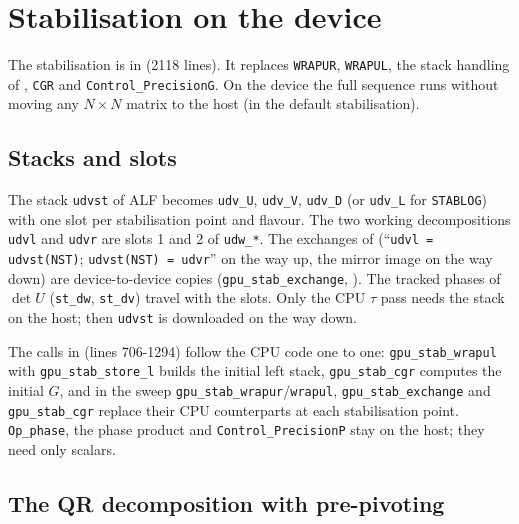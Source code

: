 \section{Stabilisation on the device}
\label{sec:stab}

The stabilisation is in  (2118 lines). It replaces \texttt{WRAPUR}, \texttt{WRAPUL}, the stack handling of , \texttt{CGR} and \texttt{Control\_PrecisionG}. On the device the full sequence runs without moving any $N\times N$ matrix to the host (in the default stabilisation).

\subsection{Stacks and slots}

The stack \texttt{udvst} of ALF becomes \texttt{udv\_U}, \texttt{udv\_V}, \texttt{udv\_D} (or \texttt{udv\_L} for \texttt{STABLOG}) with one slot per stabilisation point and flavour. The two working decompositions \texttt{udvl} and \texttt{udvr} are slots 1 and 2 of \texttt{udw\_*}. The exchanges of  (``\texttt{udvl = udvst(NST)}; \texttt{udvst(NST) = udvr}'' on the way up, the mirror image on the way down) are device-to-device copies (\texttt{gpu\_stab\_exchange}, ). The tracked phases of $\det U$ (\texttt{st\_dw}, \texttt{st\_dv}) travel with the slots. Only the CPU $\tau$ pass needs the stack on the host; then \texttt{udvst} is downloaded on the way down.

The calls in  (lines 706-1294) follow the CPU code one to one: \texttt{gpu\_stab\_wrapul} with \texttt{gpu\_stab\_store\_l} builds the initial left stack, \texttt{gpu\_stab\_cgr} computes the initial $G$, and in the sweep \texttt{gpu\_stab\_wrapur}/\texttt{wrapul}, \texttt{gpu\_stab\_exchange} and \texttt{gpu\_stab\_cgr} replace their CPU counterparts at each stabilisation point. \texttt{Op\_phase}, the phase product and \texttt{Control\_PrecisionP} stay on the host; they need only scalars.

\subsection{The QR decomposition with pre-pivoting}
\label{sec:qrpp}

